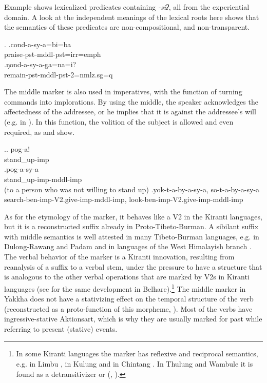 Example \Next shows lexicalized predicates containing \emph{-siʔ}, all from the experiential domain. A look at the independent meanings of the lexical roots here shows that the semantics of these predicates are non-compositional, and non-transparent.

\ex. \ag.cond-a-sy-a=bi=ba\\
		praise{\sc [3sg]-pst-mddl-pst=irr=emph}\\
	  
 	\bg.ŋond-a-sy-a-ga=na=i?\\
	remain-{\sc pst-mddl-pst-2=nmlz.sg=q}	\\


The middle marker is also used in imperatives, with the function of turning commands into implorations. By using the middle, the speaker acknowledges the affectedness of the addressee, or he implies that it is against the addressee's will (e.g. in \Next[b]). In this function, the volition of the subject is allowed and even  required, as \Next[b] and \Next[c] show. 

	 \ex.\ag. pog-a!\\
	stand\_up-{\sc imp}\\
	 \bg.pog-a-sy-a\\
	stand\_up-{\sc imp-mddl-imp}\\
	  (to a person who was not willing to stand up)
\bg.yok-t-a-by-a-sy-a, so-t-a-by-a-sy-a\\
		search-{\sc ben-imp-V2.give-imp-mddl-imp}, look{\sc -ben-imp-V2.give-imp-mddl-imp}\\
	 
 

As for the etymology of the marker, it behaves like a V2 in the Kiranti languages, but it is a reconstructed suffix already in Proto-Tibeto-Burman. A sibilant suffix with middle semantics is well attested in many Tibeto-Burman languages, e.g. in Dulong-Rawang and Padam \citep[1944]{LaPolla1996_Middle} and in languages of the West Himalayish branch \citep[471]{Matisoff2003Handbook}. The verbal behavior of the marker is a Kiranti innovation, resulting from reanalysis of a suffix to a verbal stem, under the pressure to have a structure that is analogous to the other verbal operations that are marked by V2s in Kiranti languages (see \citet[560]{Bickel2003Belhare} for the same development in Belhare).\footnote{In some Kiranti languages the marker has reflexive and reciprocal semantics, e.g. in Limbu \citep[86]{Driem1987A-grammar}, in Kulung \citep[61]{Tolsma1999A-grammar} and in Chintang \citep[300]{Bickeletal2010Ditransitives}. In Thulung and Wambule it is found as a detransitivizer or  (\citet[209]{Lahaussois2003_Thulung}, \citet[351]{Opgenort2004A-Grammar}).}  The middle marker in Yakkha does not have a stativizing effect on the temporal structure of the verb (reconstructed as a proto-function of this morpheme, \citet[471]{Matisoff2003Handbook}). Most of the verbs have ingressive-stative Aktionsart, which is why they are usually marked for past while referring to present (stative) events.

